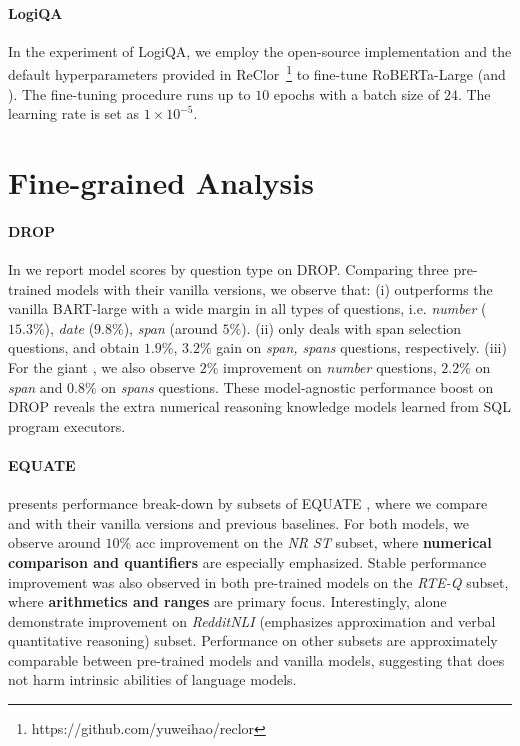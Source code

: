 \paragraph{LogiQA}

In the experiment of LogiQA, we employ the open-source implementation and the default hyperparameters provided in ReClor~\footnote{https://github.com/yuweihao/reclor} \citep{yu2020reclor} to fine-tune RoBERTa-Large (and \oursroberta).
The fine-tuning procedure runs up to $10$ epochs with a batch size of $24$.
The learning rate is set as $1{\times}{10}^{-5}$.

\section{Fine-grained Analysis}\label{sec:fine_analysis}

\paragraph{DROP} In  we report model \fone{} scores by question type on DROP. Comparing three \ours pre-trained models with their vanilla versions, we observe that: (i) \oursbart outperforms the vanilla BART-large with a wide margin in all types of questions, i.e. \textit{number} ($15.3\%$), \textit{date} ($9.8 \%$), \textit{span} (around $5\%$). (ii) \oursroberta only deals with span selection questions, and obtain $1.9\%$, $3.2\%$ gain on \textit{span, spans} questions, respectively.
(iii) For the giant \ourstfive, we also observe $2\%$ improvement on \textit{number} questions, $2.2\%$ on \textit{span} and $0.8\%$ on \textit{spans} questions. These model-agnostic performance boost on DROP reveals the extra numerical reasoning knowledge models learned from SQL program executors.

\paragraph{EQUATE}
 presents performance break-down by subsets of EQUATE \cite{ravichander-etal-2019-equate}, where we compare \oursbart and \oursroberta with their vanilla versions and previous baselines. For both models, we observe around $10\%$ acc improvement on the \textit{NR ST} subset, where \textbf{numerical comparison and quantifiers} are especially emphasized. Stable performance improvement was also observed in both pre-trained models on  the \textit{RTE-Q} subset, where \textbf{arithmetics and ranges} are primary focus. Interestingly, \oursroberta alone demonstrate improvement on \textit{RedditNLI} (emphasizes approximation and verbal quantitative reasoning) subset. Performance on other subsets are approximately comparable between \ours pre-trained models and vanilla models, suggesting that \ours does not harm intrinsic abilities of language models.

